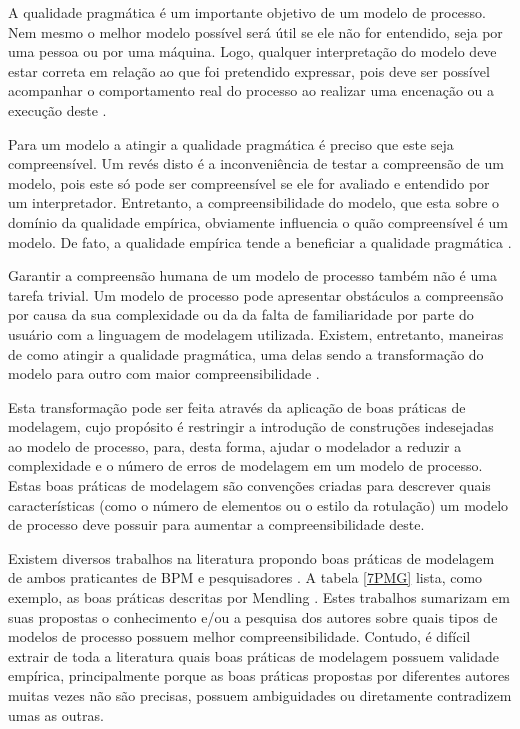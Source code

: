\documentclass[12pt]{article}
\begin{document}
A qualidade pragmática é um importante objetivo de um modelo de processo. Nem mesmo o melhor modelo possível será útil se ele não for entendido, seja por uma pessoa ou por uma máquina. Logo, qualquer interpretação do modelo deve estar correta em relação ao que foi pretendido expressar, pois deve ser possível acompanhar o comportamento real do processo ao realizar uma encenação ou a execução deste \cite{Krogstie2012}.

Para um modelo a atingir a qualidade pragmática é preciso que este seja compreensível. Um revés disto é a inconveniência de testar a compreensão de um modelo, pois este só pode ser compreensível se ele for avaliado e entendido por um interpretador. Entretanto, a compreensibilidade do modelo, que esta sobre o domínio da qualidade empírica, obviamente influencia o quão compreensível é um modelo. De fato, a qualidade empírica tende a beneficiar a qualidade pragmática \cite{Krogstie2012}.

Garantir a compreensão humana de um modelo de processo também não é uma tarefa trivial. Um modelo de processo pode apresentar obstáculos a compreensão por causa da sua complexidade ou da da falta de familiaridade por parte do usuário com a linguagem de modelagem utilizada. Existem, entretanto, maneiras de como atingir a qualidade pragmática, uma delas sendo a transformação do modelo para outro com maior compreensibilidade \cite{Krogstie2012}. 

Esta transformação pode ser feita através da aplicação de boas práticas de modelagem, cujo propósito é restringir a introdução de construções indesejadas ao modelo de processo, para, desta forma, ajudar o modelador a reduzir a complexidade e o número de erros de modelagem em um modelo de processo. Estas boas práticas de modelagem são convenções criadas para descrever quais características (como o número de elementos ou o estilo da rotulação) um modelo de processo deve possuir para aumentar a compreensibilidade deste.

Existem diversos trabalhos na literatura propondo boas práticas de modelagem de ambos praticantes de BPM \cite{Silver2009} \cite{White2008} \cite{Allweyer2010} e pesquisadores \cite{Becker2000} \cite{Mendling2007} \cite{Vanderfeesten2008} \cite{Correia2012}. A tabela \ref{7PMG} lista, como exemplo, as boas práticas descritas por Mendling \cite{Mendling2013}. Estes trabalhos sumarizam em suas propostas o conhecimento e/ou a pesquisa dos autores sobre quais tipos de modelos de processo possuem melhor compreensibilidade. Contudo, é difícil extrair de toda a literatura quais boas práticas de modelagem possuem validade empírica, principalmente porque as boas práticas propostas por diferentes autores muitas vezes não são precisas, possuem ambiguidades ou diretamente contradizem umas as outras. 
\end{document}
